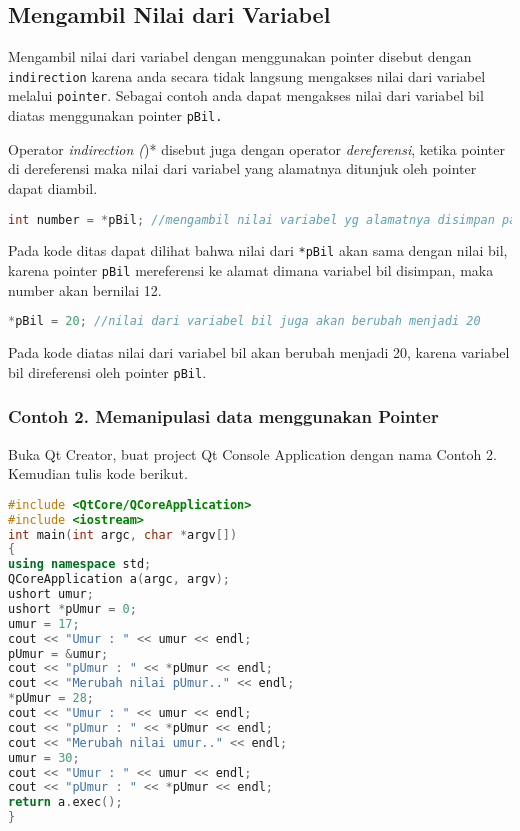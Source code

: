\subsection{Mengambil Nilai dari
Variabel}\label{mengambil-nilai-dari-variabel}

Mengambil nilai dari variabel dengan menggunakan pointer disebut dengan
\texttt{indirection} karena anda secara tidak langsung mengakses nilai
dari variabel melalui \texttt{pointer}. Sebagai contoh anda dapat
mengakses nilai dari variabel bil diatas menggunakan pointer
\texttt{pBil.}

Operator \emph{indirection (})* disebut juga dengan operator
\emph{dereferensi}, ketika pointer di dereferensi maka nilai dari
variabel yang alamatnya ditunjuk oleh pointer dapat diambil.

\begin{lstlisting}[language=c++]
int number = *pBil; //mengambil nilai variabel yg alamatnya disimpan padapointer pBil
\end{lstlisting}

Pada kode ditas dapat dilihat bahwa nilai dari \texttt{*pBil} akan sama
dengan nilai bil, karena pointer \texttt{pBil} mereferensi ke alamat
dimana variabel bil disimpan, maka number akan bernilai 12.

\begin{lstlisting}[language=c++]
*pBil = 20; //nilai dari variabel bil juga akan berubah menjadi 20
\end{lstlisting}

Pada kode diatas nilai dari variabel bil akan berubah menjadi 20, karena
variabel bil direferensi oleh pointer \texttt{pBil}.

\subsubsection*{Contoh 2. Memanipulasi data menggunakan Pointer}

Buka Qt Creator, buat project Qt Console Application dengan nama Contoh
2. Kemudian tulis kode berikut.

\begin{lstlisting}[language=c++]
#include <QtCore/QCoreApplication>
#include <iostream>
int main(int argc, char *argv[])
{
using namespace std;
QCoreApplication a(argc, argv);
ushort umur;
ushort *pUmur = 0;
umur = 17;
cout << "Umur : " << umur << endl;
pUmur = &umur;
cout << "pUmur : " << *pUmur << endl;
cout << "Merubah nilai pUmur.." << endl;
*pUmur = 28;
cout << "Umur : " << umur << endl;
cout << "pUmur : " << *pUmur << endl;
cout << "Merubah nilai umur.." << endl;
umur = 30;
cout << "Umur : " << umur << endl;
cout << "pUmur : " << *pUmur << endl;
return a.exec();
}
\end{lstlisting}


